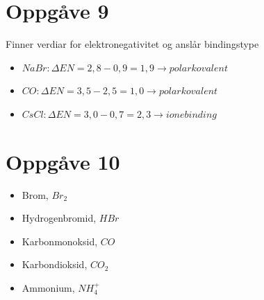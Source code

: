 \documentclass[12pt,a4paper]{article}
\begin{document}
  \section*{Oppgåve 9}
    Finner verdiar for elektronegativitet og anslår bindingstype
    \begin{itemize}
      \item $NaBr: \Delta EN = 2,8-0,9=1,9 \rightarrow polar kovalent$
      \item $CO: \Delta EN = 3,5-2,5=1,0 \rightarrow polar kovalent$
      \item $CsCl: \Delta EN = 3,0-0,7=2,3\rightarrow ionebinding$
    \end{itemize}


  \section*{Oppgåve 10}
    \begin{itemize}
      \item Brom, $Br_2$
      \item Hydrogenbromid, $HBr$
      \item Karbonmonoksid, $CO$
      \item Karbondioksid, $CO_2$
      \item Ammonium, $NH_4^+$
    \end{itemize}
\end{document}
